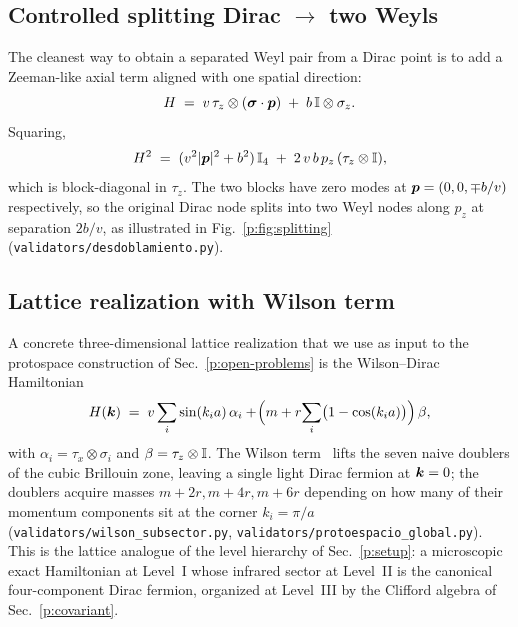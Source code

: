 \subsection{Controlled splitting Dirac \texorpdfstring{$\to$}{->} two Weyls}
The cleanest way to obtain a separated Weyl pair from a Dirac point is
to add a Zeeman-like axial term aligned with one spatial direction:
\begin{equation}
H \;=\; v\,\tau_{z}\otimes(\bm{\sigma}\cdot\bm{p})
       \;+\; b\,\mathbb{I}\otimes\sigma_{z} .
\end{equation}
Squaring,
\begin{equation}
H^{2}\;=\;(v^{2}\lvert\bm{p}\rvert^{2} + b^{2})\,\mathbb{I}_{4}
   \;+\; 2\,v\,b\,p_{z}\,(\tau_{z}\otimes\mathbb{I}) ,
\end{equation}
which is block-diagonal in $\tau_{z}$. The two blocks have zero modes at
$\bm{p}=(0,0,\mp b/v)$ respectively, so the original Dirac node splits into
two Weyl nodes along $p_{z}$ at separation $2b/v$, as illustrated in
Fig.~\ref{p:fig:splitting} (\texttt{validators/desdoblamiento.py}).

\subsection{Lattice realization with Wilson term}
A concrete three-dimensional lattice realization that we use as input to
the protospace construction of Sec.~\ref{p:open-problems} is the
Wilson--Dirac Hamiltonian
\begin{equation}
H(\bm{k}) \;=\; v \sum_{i}\sin(k_{i}a)\,\alpha_{i}
       + \!\Bigl(m + r\!\sum_{i}\bigl(1-\cos(k_{i}a)\bigr)\Bigr)\,\beta ,
\label{p:eq:Wilson3D}
\end{equation}
with $\alpha_{i}=\tau_{x}\otimes\sigma_{i}$ and $\beta=\tau_{z}\otimes\mathbb{I}$.
The Wilson term~\cite{Wilson1974} lifts the seven naive doublers of the
cubic Brillouin zone, leaving a single light Dirac fermion at $\bm{k}=0$;
the doublers acquire masses $m+2r,m+4r,m+6r$ depending on how many of
their momentum components sit at the corner $k_{i}=\pi/a$
(\texttt{validators/wilson\_subsector.py},
\texttt{validators/protoespacio\_global.py}). This is the lattice
analogue of the level hierarchy of Sec.~\ref{p:setup}: a microscopic
exact Hamiltonian at Level~I whose infrared sector at Level~II is the
canonical four-component Dirac fermion, organized at Level~III by the
Clifford algebra of Sec.~\ref{p:covariant}.
